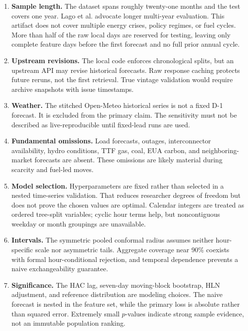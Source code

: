 \documentclass[11pt]{article}
\begin{document}
\begin{enumerate}[leftmargin=*,itemsep=5pt]
  \item \textbf{Sample length.}  The dataset spans roughly twenty-one months
  and the test covers one year.  Lago et al. \cite{lago2021} advocate longer
  multi-year evaluation.  This artifact does not cover multiple energy
  crises, policy regimes, or fuel cycles. More than half of the raw local days
  are reserved for testing, leaving only \InitialTrainingDays{} complete
  feature days before the first forecast and no full prior annual cycle.

  \item \textbf{Upstream revisions.}  The local code enforces chronological
  splits, but an upstream API may revise historical forecasts.  Raw response
  caching protects future reruns, not the first retrieval.  True vintage
  validation would require archive snapshots with issue timestamps.

  \item \textbf{Weather.}  The stitched Open-Meteo historical series is not a
  fixed D-1 forecast.  It is excluded from the primary claim.  The sensitivity
  must not be described as live-reproducible until fixed-lead runs are used.

  \item \textbf{Fundamental omissions.}  Load forecasts, outages,
  interconnector availability, hydro conditions, TTF gas, coal, EUA carbon,
  and neighboring-market forecasts are absent.  These omissions are likely
  material during scarcity and fuel-led moves.

  \item \textbf{Model selection.}  Hyperparameters are fixed rather than
  selected in a nested time-series validation.  That reduces researcher
  degrees of freedom but does not prove the chosen values are optimal.
  Calendar integers are treated as ordered tree-split variables; cyclic hour
  terms help, but noncontiguous weekday or month groupings are unavailable.

  \item \textbf{Intervals.} The symmetric pooled conformal radius assumes
  neither hour-specific scale nor asymmetric tails. Aggregate coverage near
  90\% coexists with formal hour-conditional rejection, and temporal
  dependence prevents a naive exchangeability guarantee.

  \item \textbf{Significance.} The HAC lag, seven-day moving-block bootstrap,
  HLN adjustment, and reference distribution are modeling choices. The naive
  forecast is nested in the feature set, while the primary loss is absolute
  rather than squared error. Extremely small $p$-values indicate strong sample
  evidence, not an immutable population ranking.


\end{enumerate}
\end{document}
